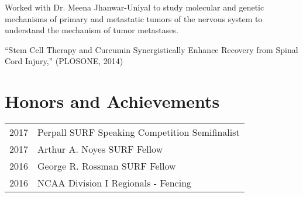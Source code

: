 \documentclass[letterpaper]{deedy-resume} %
\begin{document}
\begin{minipage}[t]{0.58\textwidth}
\sectionspace


\begin{tightitemize}
\item Worked with Dr. Meena Jhanwar-Uniyal to study molecular and genetic mechanisms of primary and metastatic tumors of the nervous system to understand the mechanism of tumor metastases.
\item ``Stem Cell Therapy and Curcumin Synergistically Enhance Recovery from Spinal Cord Injury,'' (PLOSONE, 2014)
\end{tightitemize}

\sectionspace %



\section{Honors and Achievements} 

\begin{tabular}{rl}
	2017	 & Perpall SURF Speaking Competition Semifinalist \\
	2017	 & Arthur A. Noyes SURF Fellow \\
	2016	 & George R. Rossman SURF Fellow  \\
	2016	 & NCAA Division I Regionals - Fencing\\
\end{tabular}





\end{minipage}
\end{document}

